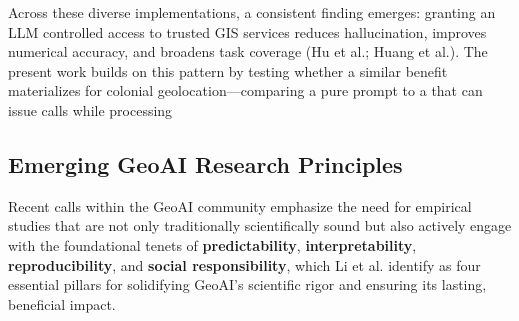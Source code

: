 Across these diverse implementations, a consistent finding emerges:
granting an LLM controlled access to trusted GIS services reduces
hallucination, improves numerical accuracy, and broadens task coverage
(Hu et al.\DIFaddbegin \DIFadd{~}\DIFaddend \citep{Hu2024_toponym_llm}; Huang et
al.\DIFaddbegin \DIFadd{~}\DIFaddend \citep{Huang2024_geoagent}). The present work builds on this pattern
by testing whether a similar benefit materializes for colonial
\DIFdelbegin {}\DIFdelend \DIFaddbegin {}\DIFaddend geolocation---comparing a pure \DIFdelbegin {}\DIFdelend \DIFaddbegin {}\DIFaddend prompt to a
\DIFdelbegin {}\DIFdelend \DIFaddbegin {}\DIFaddend that can issue \DIFdelbegin {}\DIFdelend \DIFaddbegin {}\DIFaddend calls while processing \DIFdelbegin {}\DIFdelend \DIFaddbegin {}\DIFaddend 

\subsection{Emerging GeoAI Research
Principles}\label{emerging-geoai-research-principles}

Recent calls within the GeoAI community emphasize the need for empirical
studies that are not only traditionally scientifically sound but also
actively engage with the foundational tenets of \textbf{predictability},
\textbf{interpretability}, \textbf{reproducibility}, and \textbf{social
responsibility}, which Li et al.\DIFaddbegin \DIFadd{~}\DIFaddend \citep{Li2024_geoai} identify as four
essential pillars for solidifying GeoAI's scientific rigor and ensuring
its lasting, beneficial impact.

